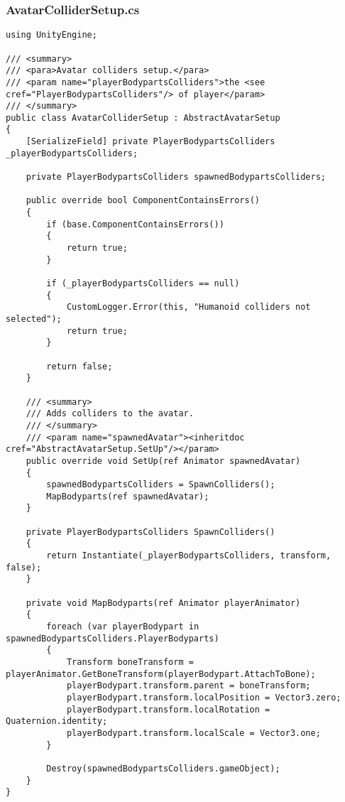 \subsubsection*{AvatarColliderSetup.cs}
\begin{verbatim}
using UnityEngine;

/// <summary>
/// <para>Avatar colliders setup.</para>
/// <param name="playerBodypartsColliders">the <see cref="PlayerBodypartsColliders"/> of player</param>
/// </summary>
public class AvatarColliderSetup : AbstractAvatarSetup
{
    [SerializeField] private PlayerBodypartsColliders _playerBodypartsColliders;
    
    private PlayerBodypartsColliders spawnedBodypartsColliders;

    public override bool ComponentContainsErrors()
    {
        if (base.ComponentContainsErrors())
        {
            return true;
        }

        if (_playerBodypartsColliders == null)
        {
            CustomLogger.Error(this, "Humanoid colliders not selected");
            return true;
        }

        return false;
    }

    /// <summary>
    /// Adds colliders to the avatar.
    /// </summary>
    /// <param name="spawnedAvatar"><inheritdoc cref="AbstractAvatarSetup.SetUp"/></param>
    public override void SetUp(ref Animator spawnedAvatar)
    {
        spawnedBodypartsColliders = SpawnColliders();
        MapBodyparts(ref spawnedAvatar);
    }

    private PlayerBodypartsColliders SpawnColliders()
    {
        return Instantiate(_playerBodypartsColliders, transform, false);
    }

    private void MapBodyparts(ref Animator playerAnimator)
    {
        foreach (var playerBodypart in spawnedBodypartsColliders.PlayerBodyparts)
        {
            Transform boneTransform = playerAnimator.GetBoneTransform(playerBodypart.AttachToBone);
            playerBodypart.transform.parent = boneTransform;
            playerBodypart.transform.localPosition = Vector3.zero;
            playerBodypart.transform.localRotation = Quaternion.identity;
            playerBodypart.transform.localScale = Vector3.one;
        }

        Destroy(spawnedBodypartsColliders.gameObject);
    }
}
\end{verbatim}
